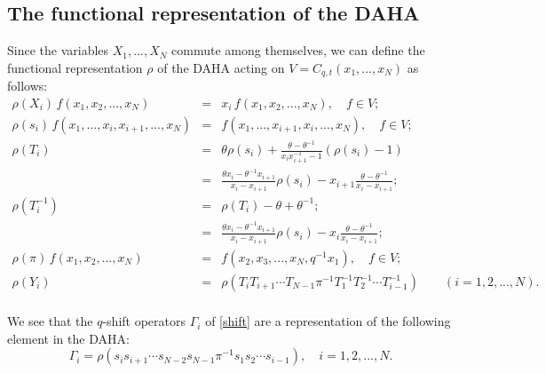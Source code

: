 \subsection{The functional representation of the DAHA}\label{secpol}

Since the variables $X_1,...,X_N$ commute among themselves, we can define the functional representation $\rho$ of the DAHA acting on $V=C_{q,t}(x_1,...,x_N)$ as follows:
\begin{eqnarray*}
\rho(X_i)\, f(x_1,x_2,...,x_N)&=& x_i\, f(x_1,x_2,...,x_N), \quad f\in V;\\
\rho(s_i)\, f(x_1,...,x_i,x_{i+1},...,x_N) &=&f(x_1,...,x_{i+1},x_{i},...,x_N),\quad f\in V; \\
\rho(T_i)&=&\theta \rho(s_i) +\frac{\theta-\theta^{-1}}{x_ix_{i+1}^{-1}-1} (\rho(s_i)-1)\\
&=&
\frac{\theta x_i-\theta^{-1}x_{i+1}}{x_i-x_{i+1}}\rho(s_i)-x_{i+1}\frac{\theta-\theta^{-1}}{x_i-x_{i+1}};\\
\rho(T_i^{-1})&=&\rho(T_i)-\theta+\theta^{-1};\\&=&
\frac{\theta x_i-\theta^{-1}x_{i+1}}{x_i-x_{i+1}}\rho(s_i)-x_{i}\frac{\theta-\theta^{-1}}{x_i-x_{i+1}};\\
\rho(\pi)\, f(x_1,x_2,...,x_{N})&=& f(x_2,x_3,...,x_{N},q^{-1}x_1), \quad f\in V; \\
\rho(Y_i)&=&\rho(T_{i}T_{i+1}\cdots T_{N-1} \pi^{-1} T_1^{-1}T_2^{-1}\cdots T_{i-1}^{-1})\qquad (i=1,2,...,N).\\
\end{eqnarray*}

We see that the $q$-shift operators $\Gamma_i$ of \eqref{shift} are a representation of the following element in the DAHA:
\begin{equation} \label{defgamma}
\Gamma_i=\rho(s_i s_{i+1} \cdots s_{N-2}s_{N-1} \pi^{-1}s_1 s_2\cdots s_{i-1}),\quad i=1,2,...,N.
\end{equation}



